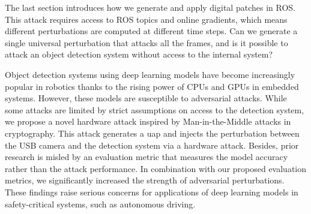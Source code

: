 The last section introduces how we generate and apply digital patches in ROS. This attack requires access to ROS topics and online gradients, which means different perturbations are computed at different time steps. Can we generate a single universal perturbation that attacks all the frames, and is it possible to attack an object detection system without access to the internal system? 


Object detection systems using deep learning models have become increasingly popular in robotics thanks to the rising power of CPUs and GPUs in embedded systems. However, these models are susceptible to adversarial attacks. While some attacks are limited by strict assumptions on access to the detection system, we propose a novel hardware attack inspired by Man-in-the-Middle attacks in cryptography. This attack generates a \acrfull{uap} and injects the perturbation between the USB camera and the detection system via a hardware attack. Besides, prior research is misled by an evaluation metric that measures the model accuracy rather than the attack performance. In combination with our proposed evaluation metrics, we significantly increased  the strength of adversarial perturbations. These findings raise serious concerns for applications of deep learning models in safety-critical systems, such as autonomous driving.


